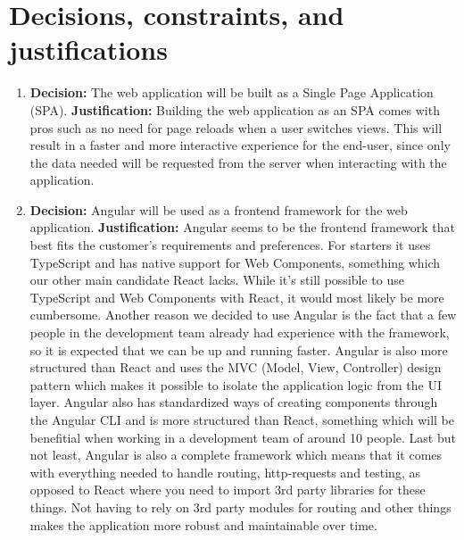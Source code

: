 \documentclass{article}
\begin{document}
\section{Decisions, constraints, and justifications}

\begin{enumerate}
    \item \textbf{Decision:} The web application will be built as a Single Page Application (SPA).
        \linebreak{}
        \textbf{Justification:} Building the web application as an SPA comes with pros such as no need for page reloads when a user switches views. This will result in a faster and more interactive experience for the end-user, since only the data needed will be requested from the server when interacting with the application.  
    \item \textbf{Decision:} Angular will be used as a frontend framework for the web application.
    \linebreak{}
    \textbf{Justification:} Angular seems to be the frontend framework that best fits the customer's requirements and preferences. For starters it uses TypeScript and has native support for Web Components, something which our other main candidate React lacks. While it's still possible to use TypeScript and Web Components with React, it would most likely be more cumbersome. Another reason we decided to use Angular is the fact that a few people in the development team already had experience with the framework, so it is expected that we can be up and running faster. Angular is also more structured than React and uses the MVC (Model, View, Controller) design pattern which makes it possible to isolate the application logic from the UI layer.
    Angular also has standardized ways of creating components through the Angular CLI and is more structured than React, something which will be benefitial when working in a development team of around 10 people. Last but not least, Angular is also a complete framework which means that it comes with everything needed to handle routing, http-requests and testing, as opposed to React where you need to import 3rd party libraries for these things. Not having to rely on 3rd party modules for routing and other things makes the application more robust and maintainable over time. 

\end{enumerate}
\end{document}
